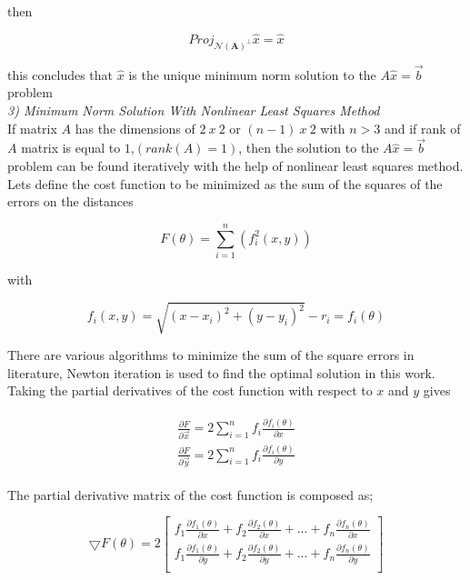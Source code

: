 then 
  
\begin{equation}
Proj_{ \mathcal{N}(\mathbf{A})^\perp}\hat{x} = \hat{x}
\end{equation}
  
this concludes that $\hat{x}$ is the unique minimum norm solution to the $A\hat{x} = \vec{b}$ problem\\
	
	
\textit{3) Minimum Norm Solution With Nonlinear Least Squares Method}\\	
If matrix $A$ has the dimensions of $2\ x\ 2$ or $(n-1)\ x\ 2$ with $n>3$ and if rank of $A$ matrix is equal to $1$,$(rank(A) = 1)$, then the solution to the $A\hat{x} = \vec{b}$ problem can be found iteratively with the help of nonlinear least squares method. Lets define the cost function to be minimized 	as the sum of the squares of the errors on the distances
	
\begin{equation}
F(\theta) = \sum_{i=1}^{n} \left(f_i^2(x,y)\right)
\end{equation}
	
with
	
\begin{equation}
f_i(x,y) = \sqrt{(x-x_i)^2 + (y - y_i)^2} - r_i = f_i(\theta) 
\end{equation}

There are various algorithms to minimize the sum of the square errors in literature, Newton iteration is used to find the optimal solution in this work.  Taking the partial derivatives of the cost function with respect to $x$ and $y$ gives 

\begin{align}
\begin{split}
\frac{\partial{F}}{\partial{\vec{x}}} = 2\sum_{i=1}^{n}f_i\frac{\partial{f_i(\theta)}}{\partial{x}} \\
\frac{\partial{F}}{\partial{\vec{y}}} = 2\sum_{i=1}^{n}f_i\frac{\partial{f_i(\theta)}}{\partial{y}}
\end{split}
\end{align}

The partial derivative matrix of the cost function is composed as;

\begin{equation}
\bigtriangledown{F(\theta)} = 2 
\begin{bmatrix}
f_1\frac{\partial{f_1(\theta)}}{\partial{x}} + f_2\frac{\partial{f_2(\theta)}}{\partial{x}} + ... + f_n\frac{\partial{f_n(\theta)}}{\partial{x}} \\
f_1\frac{\partial{f_1(\theta)}}{\partial{y}} + f_2\frac{\partial{f_2(\theta)}}{\partial{y}} + ... + f_n\frac{\partial{f_n(\theta)}}{\partial{y}} \\
\end{bmatrix}
\end{equation}	
	
